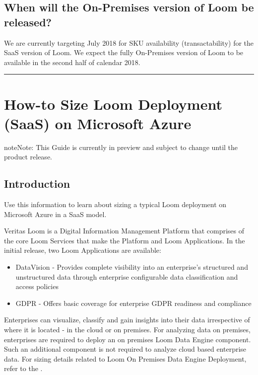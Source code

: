 \documentclass[letterpaper,10pt,english]{sphinxmanual}
\begin{document}
\section{When will the On-Premises version of Loom be released?}
\label{\detokenize{loom_trbs_faq:when-will-the-on-premises-version-of-loom-be-released}}
We are currently targeting July 2018 for SKU availability (transactability) for the SaaS version of Loom. We expect the fully On-Premises version of Loom to be available in the second half of calendar 2018.


\bigskip\hrule\bigskip



\chapter{How-to Size Loom Deployment (SaaS) on Microsoft Azure}
\label{\detokenize{loom_trbs_faq:how-to-size-loom-deployment-saas-on-microsoft-azure}}\label{\detokenize{loom_trbs_faq:ht-loom-sizing}}
\begin{sphinxadmonition}{note}{Note:}
This Guide is currently in preview and subject to change until the product release.
\end{sphinxadmonition}


\section{Introduction}
\label{\detokenize{loom_trbs_faq:introduction}}
Use this information to learn about sizing a typical Loom deployment on Microsoft Azure in a SaaS model.

Veritas Loom is a Digital Information Management Platform that comprises of the core Loom Services that make the Platform and Loom Applications.  In the initial release, two Loom Applications are available:
\begin{itemize}
\item {} 
DataVision - Provides complete visibility into an enterprise’s structured and unstructured data through enterprise configurable data classification and access policies

\item {} 
GDPR - Offers basic coverage for enterprise GDPR readiness and compliance

\end{itemize}

Enterprises can visualize, classify and gain insights into their data irrespective of where it is located - in the cloud or on premises.  For analyzing data on premises, enterprises are required to deploy an on premises Loom Data Engine component.  Such an additional component is not required to analyze cloud based enterprise data.  For sizing details related to Loom On Premises Data Engine Deployment, refer to the {\hyperref[\detokenize{loom_trbs_faq:ht-loom-op-de-sizing}]{}}.
\end{document}
